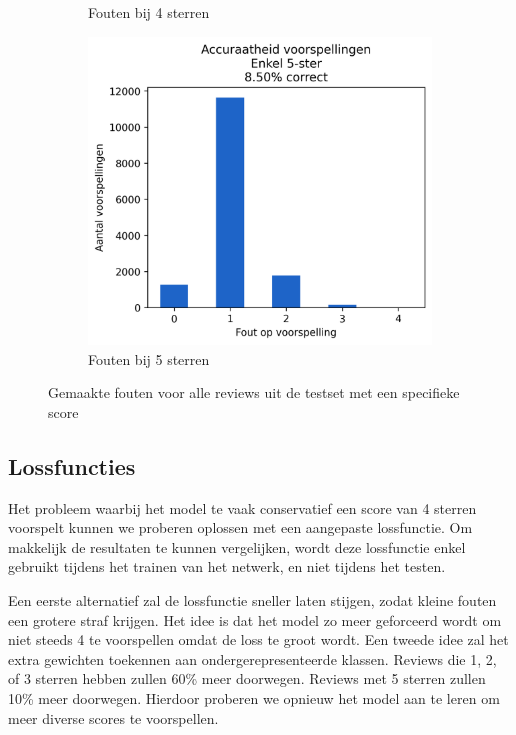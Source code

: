 \begin{figure}[H]
\begin{subfigure}{.30\textwidth}
        \caption{Fouten bij 4 sterren}
        \label{fig:chapt5_extreem_4ster}
    \end{subfigure}
    \begin{subfigure}{.30\textwidth}
        \centering
        \includegraphics[width=1\linewidth]{fig/chapt5/predictor/extreem_5ster.png}
        \caption{Fouten bij 5 sterren}
        \label{fig:chapt5_extreem_5ster}
    \end{subfigure}
    \caption{Gemaakte fouten voor alle reviews uit de testset met een specifieke score}
    \label{fig:chapt5_extreme_scores}
\end{figure}



\subsection{Lossfuncties}
Het probleem waarbij het model te vaak conservatief een score van 4 sterren voorspelt kunnen we proberen oplossen met een aangepaste lossfunctie. Om makkelijk de resultaten te kunnen vergelijken, wordt deze lossfunctie enkel gebruikt tijdens het trainen van het netwerk, en niet tijdens het testen.

Een eerste alternatief zal de lossfunctie sneller laten stijgen, zodat kleine fouten een grotere straf krijgen. Het idee is dat het model zo meer geforceerd wordt om niet steeds 4 te voorspellen omdat de loss te groot wordt.\newline
Een tweede idee zal het extra gewichten toekennen aan ondergerepresenteerde klassen. Reviews die 1, 2, of 3 sterren hebben zullen 60\% meer doorwegen. Reviews met 5 sterren zullen 10\% meer doorwegen. Hierdoor proberen we opnieuw het model aan te leren om meer diverse scores te voorspellen.\newline


